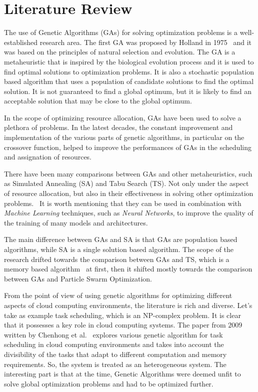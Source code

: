 \section{Literature Review}\label{sect:litreview}

The use of Genetic Algorithms (GAs) for solving optimization problems is a well-established research area.
The first GA was proposed by Holland in 1975~\cite{holland1975adaptation} and it was based on the principles of natural selection and evolution.
The GA is a metaheuristic that is inspired by the biological evolution process and it is used to find optimal solutions to optimization problems.
It is also a stochastic population based algorithm that uses a population of candidate solutions to find the optimal solution. It is not guaranteed
to find a global optimum, but it is likely to find an acceptable solution that may be close to the global optimum.~\cite{alba2008introduction}

In the scope of optimizing resource allocation, GAs have been used to solve a plethora of problems. In the latest decades, the constant improvement and implementation
of the various parts of genetic algorithms, in particular on the crossover function, helped to improve the performances of GAs in the scheduling and
assignation of resources.~\cite{alcaraz2001robust}

There have been many comparisons between GAs and other metaheuristics, such as Simulated Annealing (SA) and Tabu Search (TS).
Not only under the aspect of resource allocation, but also in their effectiveness in solving other optimization problems.~\cite{vasan2009comparative, ross1995comparing}
It is worth mentioning that they can be used in combination with \textit{Machine Learning} techniques, such as \textit{Neural Networks}, to improve the quality of the training
of many models and architectures.~\cite{sexton1999optimization}

The main difference between GAs and SA is that GAs are population based algorithms, while SA is a single solution based algorithm. The scope of the research
drifted towards the comparison between GAs and TS, which is a memory based algorithm~\cite{zolfaghari2002comparative, youssef2001evolutionary} at first, then it shifted mostly
towards the comparison between GAs and Particle Swarm Optimization.~\cite{hassan2005comparison}

From the point of view of using genetic algorithms for optimizing different aspects of cloud computing environments, the literature is rich and diverse.
Let's take as example task scheduling, which is an NP-complex problem. It is clear that it possesses a key role in cloud computing systems.
The paper from $2009$ written by Chenhong et al.~\cite{5301850} explores various genetic algorithm for task scheduling in cloud computing environments and takes into account 
the divisibility of the tasks that adapt to different computation and memory requirements. So, the system is treated as an heterogeneous system. 
The interesting part is that at the time, Genetic Algorithms were deemed unfit to solve global optimization problems and had to be optimized further.~\cite{5301850}

